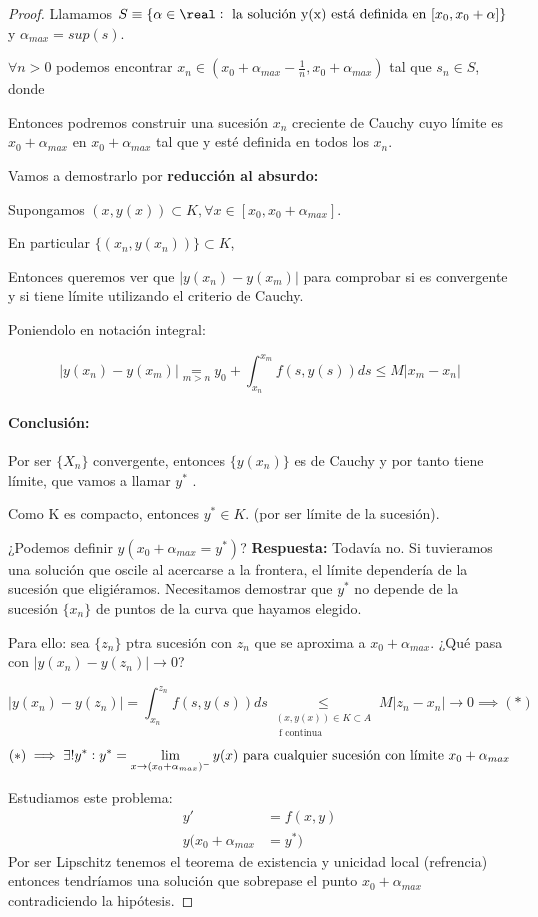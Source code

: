 \documentclass{mathnotes}
\begin{document}
\begin{proof}
Llamamos $S\equiv \{\alpha\in\real \st \text{ la solución y(x) está definida en } [x_0,x_0+\alpha] \}$ y $\alpha_{max} = sup(s)$.

$\forall n>0$ podemos encontrar $x_n \in \left(x_0 + \alpha_{max} - \frac{1}{n},x_0+\alpha_{max}\right)$ tal que $s_n\in S$, donde 

Entonces podremos construir una sucesión $x_n$ creciente de Cauchy cuyo límite es $x_0+\alpha_{max}$ en $x_0 + \alpha_{max}$ tal que y esté definida en todos los $x_n$.

Vamos a demostrarlo por \textbf{reducción al absurdo:}

Supongamos $(x,y(x))\subset K, \forall x\in[x_0,x_0+\alpha_{max}]$.

En particular $\{(x_n,y(x_n))\}\subset K$,


Entonces queremos ver que $| y(x_n) - y(x_m)|$ para comprobar si es convergente y si tiene límite utilizando el criterio de Cauchy.

Poniendolo en notación integral:

\[| y(x_n) - y(x_m)| \underset{m>n}{=} y_0 + \int_{x_n}^{x_m} f(s,y(s))ds \leq M |x_m-x_n| \]

\paragraph{Conclusión:}
Por ser $\{X_n\}$ convergente, entonces $\{y(x_n)\}$ es de Cauchy y por tanto tiene límite, que vamos a llamar $y^{\ast}$ .

Como K es compacto, entonces $y^{\ast}\in K$. (por ser límite de la sucesión).

¿Podemos definir $y(x_0+\alpha_{max} = y^{\ast})$? 
\textbf{Respuesta:} Todavía no. Si tuvieramos una solución que oscile al acercarse a la frontera, el límite dependería de la sucesión que eligiéramos. Necesitamos demostrar que $y^{\ast}$ no depende de la sucesión $\{x_n\}$ de puntos de la curva que hayamos elegido.

Para ello: sea $\{z_n\}$ ptra sucesión con $z_n$ que se aproxima a $x_0+\alpha_{max}$. ¿Qué pasa con $|y(x_n) - y(z_n)| \to 0$? 


\[|y(x_n) - y(z_n)| = \int_{x_n}^{z_n} f(s,y(s))ds \underset{\begin{array}{c}(x,y(x))\in K \subset A\\\text{ f continua }\end{array}}{\leq}M |z_n - x_n| \to 0 \implies (*) \]
\[(*) \implies \exists!y^{\ast} : y^{\ast} = \lim_{x\to (x_0+\alpha_{max})^{-}} y(x) \text{ para cualquier sucesión con límite } x_0+\alpha_{max}\]


Estudiamos este problema:
\[\begin{array}{cc}
y' &= f(x,y)\\
y(x_0+\alpha_{max} &= y^{\ast})
\end{array}\]
Por ser Lipschitz tenemos el teorema de existencia y unicidad local (refrencia) entonces tendríamos una solución que sobrepase el punto $x_0+\alpha_{max}$ contradiciendo la hipótesis.

\end{proof}
\end{document}
